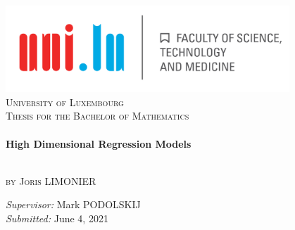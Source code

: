 \begin{titlepage}
	\begin{center}
		\includegraphics[width=0.8\textwidth]{images/logo.png}\\[2cm]
		\textsc{\LARGE University of Luxembourg}\\[2cm]
		\textsc{\Large Thesis for the Bachelor of Mathematics}\\[0cm]
		\vspace{1cm}
		\HRule \\[0.7cm]
		
		{ \Huge \bfseries High Dimensional Regression Models}\\[0.4cm]
		
		\HRule \\[1.5cm]
		
		 \vspace{.5cm}
		
		\large
		\textsc{by} \textsc{\Large Joris LIMONIER}\\ %
		
		\vfill
		
		\emph{Supervisor:} Mark PODOLSKIJ\\
		\emph{Submitted:} June 4, 2021
	\end{center}
\end{titlepage}

